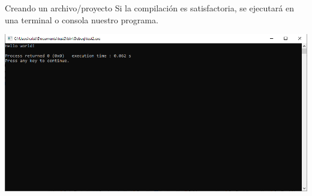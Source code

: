 \documentclass[11pt]{beamer}
\begin{document}
\begin{frame}{Creando un archivo/proyecto}
    \justifying
    Si la compilación es satisfactoria, se ejecutará en una terminal o consola nuestro programa.
    
    \centering
    \includegraphics[width=\textwidth]{cb32_1.png}
\end{frame}
\end{document}
